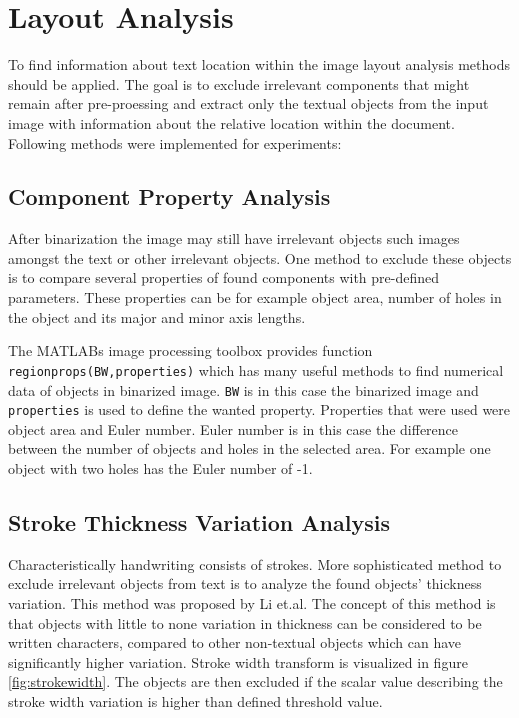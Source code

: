 \documentclass{article}
\def\code#1{\texttt{#1}}
\begin{document}
    \newpage
    \section{Layout Analysis}
      To find information about text location within the image layout analysis methods should be applied. The goal is to exclude irrelevant components that might remain after pre-proessing and extract only the textual objects from the input image with information about the relative location within the document. Following methods were implemented for experiments:



        \subsection{Component Property Analysis}
          After binarization the image may still have irrelevant objects such images amongst the text or other irrelevant objects. One method to exclude these objects is to compare several properties of found components with pre-defined parameters. These properties can be for example object area, number of holes in the object and its major and minor axis lengths.

          The MATLABs image processing toolbox  provides function \code{regionprops(BW,properties)} which has many useful methods to find numerical data of objects in binarized image. \code{BW} is in this case the binarized image and \code{properties} is used to define the wanted property. Properties that were used were object area and Euler number. Euler number is in this case the difference between the number of objects and holes in the selected area. For example one object with two holes has the Euler number of -1.

        \subsection{Stroke Thickness Variation Analysis}
          Characteristically handwriting consists of strokes. More sophisticated method to exclude irrelevant objects from text is to analyze the found objects' thickness variation. This method was proposed by Li et.al. \cite{Li} The concept of this method is that objects with little to none variation in thickness can be considered to be written characters, compared to other non-textual objects which can have significantly higher variation. Stroke width transform is visualized in figure \ref{fig:strokewidth}. The objects are then excluded if the scalar value describing the stroke width variation is higher than defined threshold value.
\end{document}
